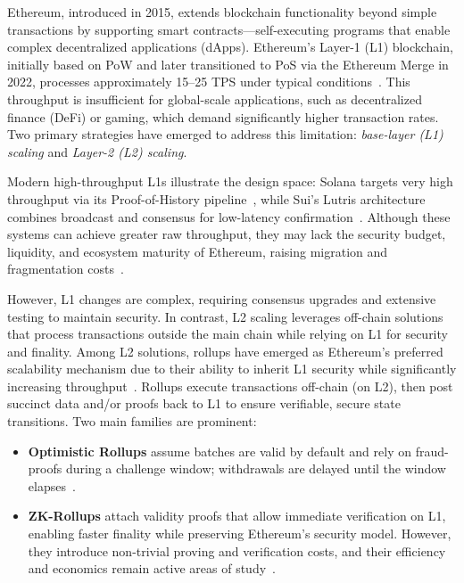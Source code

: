 Ethereum, introduced in 2015, extends blockchain functionality beyond simple transactions by supporting smart contracts—self-executing programs that enable complex decentralized applications (dApps). Ethereum's Layer-1 (L1) blockchain, initially based on PoW and later transitioned to PoS via the Ethereum Merge in 2022, processes approximately 15–25 TPS under typical conditions~\cite{buterin2014ethereum,ethScalingDocs}. This throughput is insufficient for global-scale applications, such as decentralized finance (DeFi) or gaming, which demand significantly higher transaction rates. Two primary strategies have emerged to address this limitation: \emph{base-layer (L1) scaling} and \emph{Layer-2 (L2) scaling}.
\vspace{12pt}

Modern high-throughput L1s illustrate the design space: Solana targets very high throughput via its Proof-of-History pipeline~\cite{yakovenko2018solana}, while Sui’s Lutris architecture combines broadcast and consensus for low-latency confirmation~\cite{blackshear2023sui}. Although these systems can achieve greater raw throughput, they may lack the security budget, liquidity, and ecosystem maturity of Ethereum, raising migration and fragmentation costs~\cite{habib2025bottlenecks}.

\vspace{12pt}

However, L1 changes are complex, requiring consensus upgrades and extensive testing to maintain security. In contrast, L2 scaling leverages off-chain solutions that process transactions outside the main chain while relying on L1 for security and finality. Among L2 solutions, rollups have emerged as Ethereum's preferred scalability mechanism due to their ability to inherit L1 security while significantly increasing throughput~\cite{ethScalingDocs}. Rollups execute transactions off-chain (on L2), then post succinct data and/or proofs back to L1 to ensure verifiable, secure state transitions. Two main families are prominent:

\vspace{12pt}

\begin{itemize}
   \item \textbf{Optimistic Rollups} assume batches are valid by default and rely on fraud-proofs during a challenge window; withdrawals are delayed until the window elapses~\cite{ethOptimisticRollups}.
  \vspace{12pt}
  \item \textbf{ZK-Rollups} attach validity proofs that allow immediate verification on L1, enabling faster finality while preserving Ethereum’s security model. However, they introduce non-trivial proving and verification costs, and their efficiency and economics remain active areas of study~\cite{habib2025bottlenecks}.
\end{itemize}

